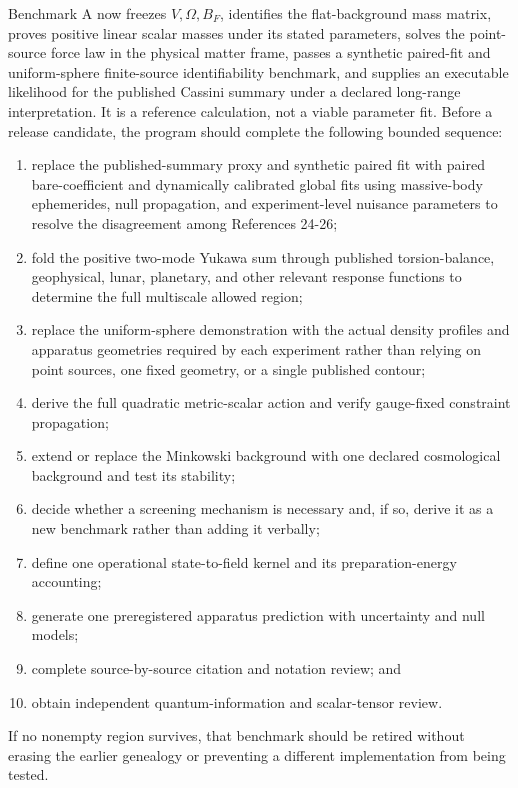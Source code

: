 \documentclass[
  american,
  11pt,
  letterpaper,
]{article}
\newcounter{none} %
\providecommand{\tightlist}{%
  \setlength{\itemsep}{0pt}\setlength{\parskip}{0pt}}
\begin{document}
Benchmark A now freezes \(V,\Omega,B_F\), identifies the flat-background mass matrix, proves positive linear scalar masses under its stated parameters, solves the point-source force law in the physical matter frame, passes a synthetic paired-fit and uniform-sphere finite-source identifiability benchmark, and supplies an executable likelihood for the published Cassini summary under a declared long-range interpretation. It is a reference calculation, not a viable parameter fit. Before a release candidate, the program should complete the following bounded sequence:

\begin{enumerate}
\def\labelenumi{\arabic{enumi}.}
\tightlist
\item
  replace the published-summary proxy and synthetic paired fit with paired bare-coefficient and dynamically calibrated global fits using massive-body ephemerides, null propagation, and experiment-level nuisance parameters to resolve the disagreement among References 24-26;
\item
  fold the positive two-mode Yukawa sum through published torsion-balance, geophysical, lunar, planetary, and other relevant response functions to determine the full multiscale allowed region;
\item
  replace the uniform-sphere demonstration with the actual density profiles and apparatus geometries required by each experiment rather than relying on point sources, one fixed geometry, or a single published contour;
\item
  derive the full quadratic metric-scalar action and verify gauge-fixed constraint propagation;
\item
  extend or replace the Minkowski background with one declared cosmological background and test its stability;
\item
  decide whether a screening mechanism is necessary and, if so, derive it as a new benchmark rather than adding it verbally;
\item
  define one operational state-to-field kernel and its preparation-energy accounting;
\item
  generate one preregistered apparatus prediction with uncertainty and null models;
\item
  complete source-by-source citation and notation review; and
\item
  obtain independent quantum-information and scalar-tensor review.
\end{enumerate}

If no nonempty region survives, that benchmark should be retired without erasing the earlier genealogy or preventing a different implementation from being tested.
\end{document}
